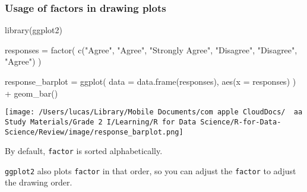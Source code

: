 \documentclass[
]{article}
\newenvironment{Shaded}{}{}
\newcommand{\AttributeTok}[1]{\textcolor[rgb]{0.49,0.56,0.16}{#1}}
\newcommand{\CommentTok}[1]{\textcolor[rgb]{0.38,0.63,0.69}{\textit{#1}}}
\newcommand{\FunctionTok}[1]{\textcolor[rgb]{0.02,0.16,0.49}{#1}}
\newcommand{\NormalTok}[1]{#1}
\newcommand{\OtherTok}[1]{\textcolor[rgb]{0.00,0.44,0.13}{#1}}
\newcommand{\SpecialCharTok}[1]{\textcolor[rgb]{0.25,0.44,0.63}{#1}}
\newcommand{\StringTok}[1]{\textcolor[rgb]{0.25,0.44,0.63}{#1}}
\begin{document}
\hypertarget{usage-of-factors-in-drawing-plots}{%
\subsubsection{Usage of factors in drawing
plots}\label{usage-of-factors-in-drawing-plots}}

\begin{Shaded}
\begin{Highlighting}[]
\FunctionTok{library}\NormalTok{(ggplot2)}

\NormalTok{responses }\OtherTok{=}
  \FunctionTok{factor}\NormalTok{(}
    \FunctionTok{c}\NormalTok{(}\StringTok{"Agree"}\NormalTok{, }\StringTok{"Agree"}\NormalTok{, }\StringTok{"Strongly Agree"}\NormalTok{, }\StringTok{"Disagree"}\NormalTok{, }\StringTok{"Disagree"}\NormalTok{, }\StringTok{"Agree"}\NormalTok{)}
\NormalTok{  )}

\NormalTok{response\_barplot }\OtherTok{=}
  \FunctionTok{ggplot}\NormalTok{(}
    \AttributeTok{data =} \FunctionTok{data.frame}\NormalTok{(responses),}
    \FunctionTok{aes}\NormalTok{(}\AttributeTok{x =}\NormalTok{ responses)}
\NormalTok{  ) }\SpecialCharTok{+}
  \FunctionTok{geom\_bar}\NormalTok{()}
\end{Highlighting}
\end{Shaded}

\texttt{[image: /Users/lucas/Library/Mobile Documents/com~apple~CloudDocs/~~aa Study Materials/Grade 2 I/Learning/R for Data Science/R-for-Data-Science/Review/image/response\_barplot.png]}

By default, \texttt{factor} is sorted alphabetically.

\texttt{ggplot2} also plots \texttt{factor} in that order, so you can
adjust the \texttt{factor} to adjust the drawing order.

\begin{Shaded}
\end{Shaded}
\end{document}
